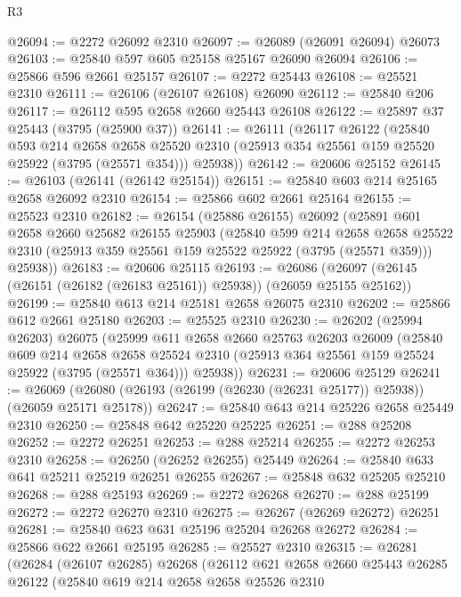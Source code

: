 \begin{lexlean}{R3}
\begin{coremodule}
@26094 := @2272 @26092 @2310
@26097 := @26089 (@26091 @26094) @26073
@26103 := @25840 @597 @605 @25158 @25167 @26090 @26094
@26106 := @25866 @596 @2661 @25157
@26107 := @2272 @25443
@26108 := @25521 @2310
@26111 := @26106 (@26107 @26108) @26090
@26112 := @25840 @206
@26117 := @26112 @595 @2658 @2660 @25443 @26108
@26122 := @25897 @37 @25443 (@3795 (@25900 @37))
@26141 := @26111
    (@26117
      @26122
      (@25840
        @593
        @214
        @2658
        @2658
        @25520
        @2310
        (@25913 @354 @25561 @159 @25520 @25922 (@3795 (@25571 @354)))
        @25938))
@26142 := @20606 @25152
@26145 := @26103 (@26141 (@26142 @25154))
@26151 := @25840 @603 @214 @25165 @2658 @26092 @2310
@26154 := @25866 @602 @2661 @25164
@26155 := @25523 @2310
@26182 := @26154
    (@25886 @26155)
    @26092
    (@25891
      @601
      @2658
      @2660
      @25682
      @26155
      @25903
      (@25840
        @599
        @214
        @2658
        @2658
        @25522
        @2310
        (@25913 @359 @25561 @159 @25522 @25922 (@3795 (@25571 @359)))
        @25938))
@26183 := @20606 @25115
@26193 := @26086 (@26097 (@26145 (@26151 (@26182 (@26183 @25161)) @25938)) (@26059 @25155 @25162))
@26199 := @25840 @613 @214 @25181 @2658 @26075 @2310
@26202 := @25866 @612 @2661 @25180
@26203 := @25525 @2310
@26230 := @26202
    (@25994 @26203)
    @26075
    (@25999
      @611
      @2658
      @2660
      @25763
      @26203
      @26009
      (@25840
        @609
        @214
        @2658
        @2658
        @25524
        @2310
        (@25913 @364 @25561 @159 @25524 @25922 (@3795 (@25571 @364)))
        @25938))
@26231 := @20606 @25129
@26241 := @26069 (@26080 (@26193 (@26199 (@26230 (@26231 @25177)) @25938)) (@26059 @25171 @25178))
@26247 := @25840 @643 @214 @25226 @2658 @25449 @2310
@26250 := @25848 @642 @25220 @25225
@26251 := @288 @25208
@26252 := @2272 @26251
@26253 := @288 @25214
@26255 := @2272 @26253 @2310
@26258 := @26250 (@26252 @26255) @25449
@26264 := @25840 @633 @641 @25211 @25219 @26251 @26255
@26267 := @25848 @632 @25205 @25210
@26268 := @288 @25193
@26269 := @2272 @26268
@26270 := @288 @25199
@26272 := @2272 @26270 @2310
@26275 := @26267 (@26269 @26272) @26251
@26281 := @25840 @623 @631 @25196 @25204 @26268 @26272
@26284 := @25866 @622 @2661 @25195
@26285 := @25527 @2310
@26315 := @26281
    (@26284
      (@26107 @26285)
      @26268
      (@26112
        @621
        @2658
        @2660
        @25443
        @26285
        @26122
        (@25840
          @619
          @214
          @2658
          @2658
          @25526
          @2310

\end{coremodule}
\end{lexlean}
